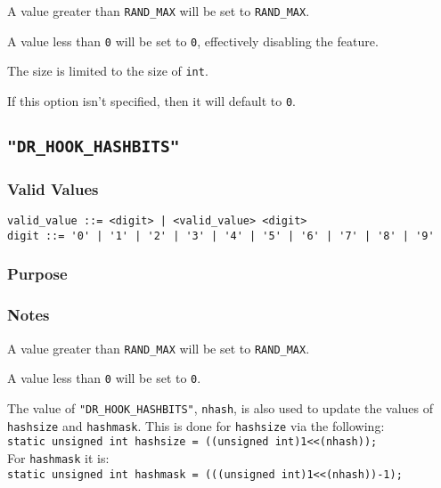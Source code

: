 A value greater than \verb|RAND_MAX| will be set to \verb|RAND_MAX|.

A value less than \verb|0| will be set to \verb|0|, effectively disabling the feature.

The size is limited to the size of \verb|int|.

If this option isn't specified, then it will default to \verb|0|.



\subsection{\texttt{"DR\_HOOK\_HASHBITS"}}
\label{section:flags:DR_HOOK_HASHBITS}
\vspace{-2ex}
\subsubsection{Valid Values}
\vspace{-2ex}
\verb+valid_value ::= <digit> | <valid_value> <digit> + \\
\verb+digit ::= '0' | '1' | '2' | '3' | '4' | '5' | '6' | '7' | '8' | '9'+

\vspace{-2ex}
\subsubsection{Purpose}
\vspace{-2ex}

\vspace{-2ex}
\subsubsection{Notes}
\vspace{-2ex}

A value greater than \verb|RAND_MAX| will be set to \verb|RAND_MAX|.

A value less than \verb|0| will be set to \verb|0|.

The value of \texttt{"DR\_HOOK\_HASHBITS"}, \verb|nhash|, is also used to update the values of \verb|hashsize| and \verb|hashmask|. This is done for \verb|hashsize| via the following:\\
\verb|static unsigned int hashsize = ((unsigned int)1<<(nhash));|\\
For \verb|hashmask| it is:\\
\verb|static unsigned int hashmask = (((unsigned int)1<<(nhash))-1);|

